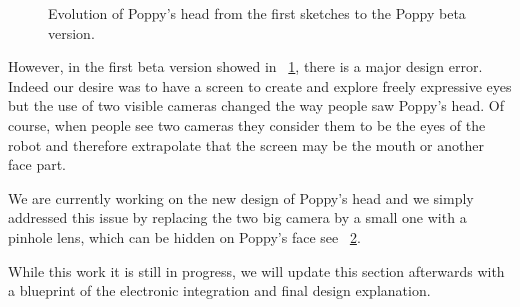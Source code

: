 \begin{figure}[p]
\centering
    \hfil
    \newline
    \hfil
    \newline
    \hfil
    \caption{Evolution of Poppy’s head from the first sketches to the Poppy beta version.}
    \label{fig:head_sketch}
\end{figure}


However, in the first beta version showed in \figurename~\ref{fig:head_sketch}, there is a major design error. Indeed our desire was to have a screen to create and explore freely expressive eyes but the use of two visible cameras changed the way people saw Poppy's head. Of course, when people see two cameras they consider them to be the eyes of the robot and therefore extrapolate that the screen may be the mouth or another face part.

We are currently working on the new design of Poppy's head and we simply addressed this issue by replacing the two big camera by a small one with a pinhole lens, which can be hidden on Poppy’s face see \figurename~\ref{fig:poppy_head_v1}.

\begin{figure}[tb]
\centering
    \caption{}
    \label{fig:poppy_head_v1}
\end{figure}


While this work it is still in progress, we will update this section afterwards with a blueprint of the electronic integration and final design explanation.
